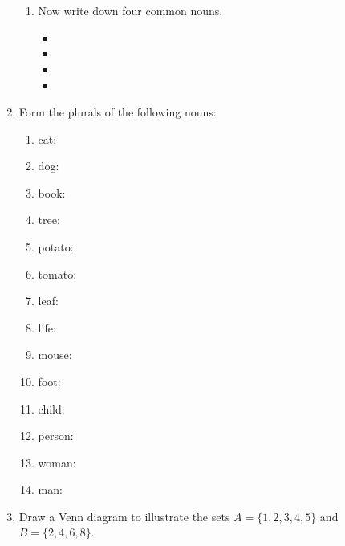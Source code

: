 \documentclass{tufte-book}
\begin{document}
\begin{enumerate}
\begin{enumerate}
  \item Now write down four common nouns.
  \begin{multicols}{2}
  \begin{itemize}
    \item \dotfill\bigskip
    \item \dotfill\bigskip
    \item \dotfill\bigskip
    \item \dotfill\bigskip
  \end{itemize}
  \end{multicols}
  \end{enumerate}

  \item Form the plurals of the following nouns:
  \begin{multicols}{2}
  \begin{enumerate}
    \item cat: \dotfill\bigskip
    \item dog: \dotfill\bigskip
    \item book: \dotfill\bigskip
    \item tree: \dotfill\bigskip
    \item potato: \dotfill\bigskip
    \item tomato: \dotfill\bigskip
    \item leaf: \dotfill
    \item life: \dotfill\bigskip
    \item mouse: \dotfill\bigskip
    \item foot: \dotfill\bigskip
    \item child: \dotfill\bigskip
    \item person: \dotfill\bigskip
    \item woman: \dotfill\bigskip
    \item man: \dotfill\bigskip
  \end{enumerate}
  \end{multicols}
  
  \item 
  Draw a Venn diagram to illustrate the sets
    $A = \{1, 2, 3, 4, 5\}$ and
    $B = \{2, 4, 6, 8\}$.
\end{enumerate}
\end{document}
